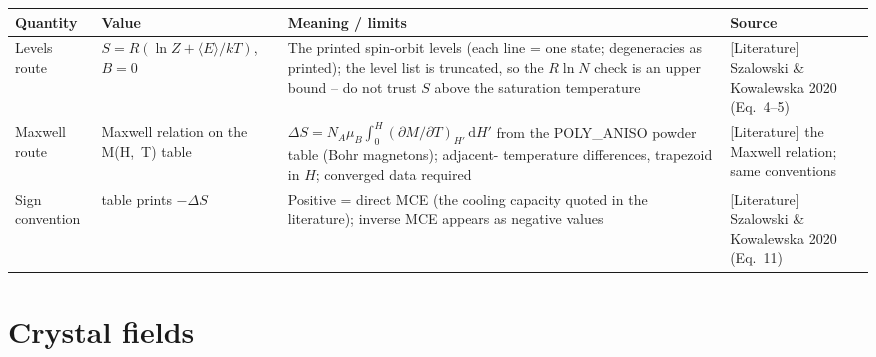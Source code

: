 \begin{center}
\begin{tabularx}{\textwidth}{@{}>{\raggedright\arraybackslash}p{3.2cm} >{\raggedright\arraybackslash}p{2.6cm} X >{\raggedright\arraybackslash}p{3.0cm}@{}}
\toprule
Quantity & Value & Meaning / limits & Source \\
\midrule
Levels route & $S=R(\ln Z+\langle E\rangle/kT)$, $B=0$ & The printed
  spin-orbit levels (each line = one state; degeneracies as printed); the
  level list is truncated, so the $R\ln N$ check is an upper bound -- do
  not trust $S$ above the saturation temperature & \textsf{[Literature]}
  Szalowski \& Kowalewska 2020 (Eq.~4--5) \\
Maxwell route & Maxwell relation on the M(H,~T) table
  & $\Delta S = N_A\mu_B\int_0^H(\partial M/\partial T)_{H'}\,\mathrm{d}H'$
  from the POLY\_ANISO powder table (Bohr magnetons); adjacent-
  temperature differences, trapezoid in $H$; converged data required &
  \textsf{[Literature]} the Maxwell relation; same conventions \\
Sign convention & table prints $-\Delta S$ & Positive = direct MCE (the
  cooling capacity quoted in the literature); inverse MCE appears as
  negative values & \textsf{[Literature]} Szalowski \& Kowalewska 2020
  (Eq.~11) \\
\bottomrule
\end{tabularx}
\end{center}

\section{Crystal fields}

